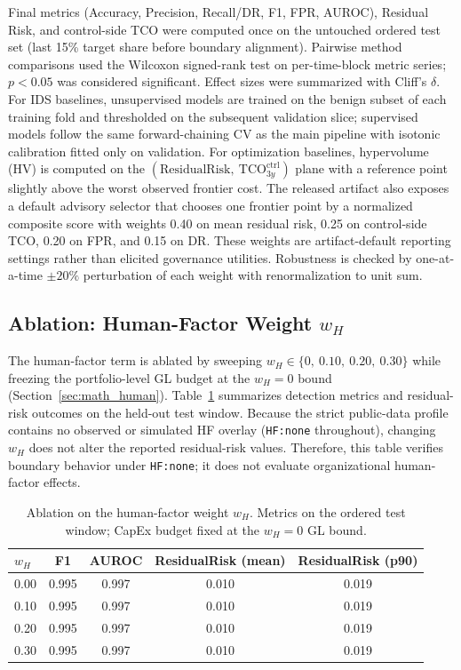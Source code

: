 \documentclass[preprint,12pt]{elsarticle}
\def\textsubscript#1{#1}%
\begin{document}
Final metrics (Accuracy, Precision, Recall/DR, F\textsubscript{1}, FPR, AUROC), Residual Risk, and control-side TCO were computed once on the untouched ordered test set (last 15\% target share before boundary alignment). Pairwise method comparisons used the Wilcoxon signed-rank test on per-time-block metric series; $p<0.05$ was considered significant. Effect sizes were summarized with Cliff's $\delta$. For IDS baselines, unsupervised models are trained on the benign subset of each training fold and thresholded on the subsequent validation slice; supervised models follow the same forward-chaining CV as the main pipeline with isotonic calibration fitted only on validation. For optimization baselines, hypervolume (HV) is computed on the $(\text{ResidualRisk},\ \mathrm{TCO}^{\mathrm{ctrl}}_{3y})$ plane with a reference point slightly above the worst observed frontier cost. The released artifact also exposes a default advisory selector that chooses one frontier point by a normalized composite score with weights 0.40 on mean residual risk, 0.25 on control-side TCO, 0.20 on FPR, and 0.15 on DR. These weights are artifact-default reporting settings rather than elicited governance utilities. Robustness is checked by one-at-a-time $\pm 20\%$ perturbation of each weight with renormalization to unit sum.

\subsection{Ablation: Human-Factor Weight \texorpdfstring{$w_H$}{w\_H}}
\label{sec:ablation_hf}

The human-factor term is ablated by sweeping $w_H\in\{0,\ 0.10,\ 0.20,\ 0.30\}$ while
freezing the portfolio-level GL budget at the $w_H{=}0$ bound (Section~\ref{sec:math_human}).
Table~\ref{tab:ablation_hf} summarizes detection metrics and residual-risk outcomes on the held-out test window. Because the strict public-data profile contains no observed or simulated HF overlay (\texttt{HF:none} throughout), changing $w_H$ does not alter the reported residual-risk values. Therefore, this table verifies boundary behavior under \texttt{HF:none}; it does not evaluate organizational human-factor effects.
\begin{table}[H]
\caption{Ablation on the human-factor weight \texorpdfstring{$w_H$}{wH}. Metrics on the ordered test window; CapEx budget fixed at the \texorpdfstring{$w_H{=}0$}{wH=0} GL bound.}
\label{tab:ablation_hf}
\centering
\begin{tabular}{lcccc}
\toprule
$w_H$ & F\textsubscript{1} & AUROC & ResidualRisk (mean) & ResidualRisk (p90) \\
\midrule
0.00 & 0.995 & 0.997 & 0.010 & 0.019 \\
0.10 & 0.995 & 0.997 & 0.010 & 0.019 \\
0.20 & 0.995 & 0.997 & 0.010 & 0.019 \\
0.30 & 0.995 & 0.997 & 0.010 & 0.019 \\
\bottomrule
\end{tabular}
\end{table}
\end{document}
